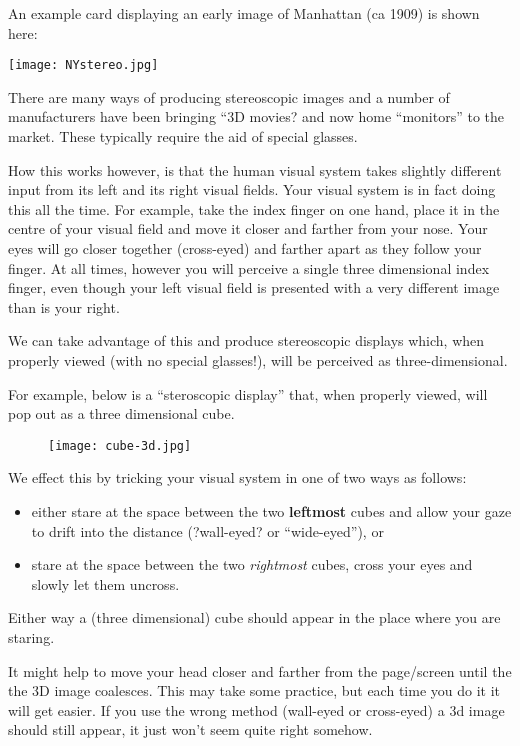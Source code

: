 \documentclass[12]{article}
\begin{document}
\begin{enumerate}
An example card displaying an early image of Manhattan (ca 1909) is shown here:
\begin{center}
\texttt{[image: NYstereo.jpg]} 
\end{center}

There are many ways of producing stereoscopic images and a number of  manufacturers
have been bringing ``3D movies?  and now home ``monitors'' to the market.  These typically
require the aid of special glasses.

How this works however, is that the human visual system takes slightly different input from its left and its right visual fields.
Your visual system is in fact doing this all the time.  For example,  take the index finger on one hand, place it in the centre of your visual field and move it closer and farther from your nose.  Your eyes will go closer together (cross-eyed) and farther apart as they follow your finger.  At all times, however you will perceive a single three dimensional index finger, even though your left visual field is presented with a very different image than is your right.

We can take advantage of this and produce stereoscopic displays which, when properly viewed (with no special glasses!), will be perceived as three-dimensional.

For example, below is a ``steroscopic display''  that, when properly viewed, will pop out as a three dimensional cube.
\begin{figure}[htb]
\begin{center}
\texttt{[image: cube-3d.jpg]} 
\end{center}
\end{figure}
We effect this by tricking your visual system in one of two ways as follows:
\begin{itemize}
\item either  stare at the space between the
two {\bf leftmost} cubes and allow your gaze to drift into the distance (?wall-eyed? or ``wide-eyed''), or 
\item stare at the space between
the two {\em rightmost} cubes, cross your eyes and slowly let them uncross.
\end{itemize}
Either way a (three dimensional) cube
should appear in the place where you are staring. 

It might help to move your head closer and farther from the
page/screen until the the 3D image coalesces. This may take some practice, but each time you do it it will get
easier. If you use the wrong method (wall-eyed or cross-eyed) a 3d image should still appear, it just  won't seem quite right somehow.


\end{enumerate}
\end{document}
